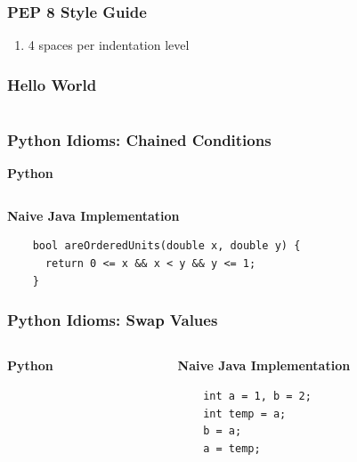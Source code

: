 \documentclass{beamer}
\begin{document}
\begin{frame}
  \frametitle{PEP 8 Style Guide}
  \begin{enumerate}
    \item 4 spaces per indentation level
  \end{enumerate}
\end{frame}

\begin{frame}
  \frametitle{Hello World}
  \inputminted{python}{hello.py}
\end{frame}

\begin{frame}[fragile]
  \frametitle{Python Idioms: Chained Conditions}
  \textbf{Python}
  \inputminted{python}{ordered_units.py}
  
  \textbf{Naive Java Implementation}
  \begin{lstlisting}
    bool areOrderedUnits(double x, double y) {
      return 0 <= x && x < y && y <= 1;
    }
  \end{lstlisting}
\end{frame}

    
\begin{frame}[fragile]
  \frametitle{Python Idioms: Swap Values}
  \begin{columns}
  \begin{column}{0.5\textwidth}
    \textbf{Python}
    \inputminted{python}{swap.py}
  \end{column}
  \begin{column}{0.5\textwidth}
  \textbf{Naive Java Implementation}
  \begin{lstlisting}
    int a = 1, b = 2;
    int temp = a;
    b = a;
    a = temp;
  \end{lstlisting}
  \end{column}
  \end{columns}
\end{frame}

%
\end{document}
